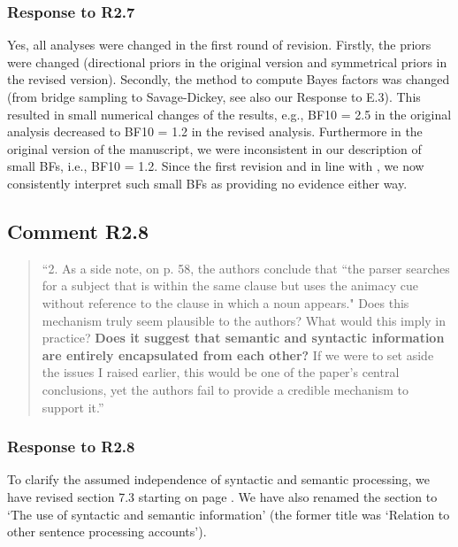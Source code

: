 \documentclass[12pt]{article}
\begin{document}
\subsubsection*{Response to R2.7}
Yes, all analyses were changed in the first round of revision. Firstly, the priors were changed (directional priors in the original version and symmetrical priors in the revised version). Secondly, the method to compute Bayes factors was changed (from bridge sampling to Savage-Dickey, see also our Response to E.3). This resulted in small numerical changes of the results, e.g., BF10 = 2.5 in the original analysis decreased to BF10 = 1.2 in the revised analysis. Furthermore in the original version of the manuscript, we were inconsistent in our description of small BFs, i.e., BF10 = 1.2. Since the first revision and in line with \cite{lee2014bayesian}, we now consistently interpret such small BFs as providing no evidence either way.

 
\subsection*{Comment R2.8}
\begin{quote}
``2. As a side note, on p. 58, the authors conclude that ``the parser searches for a subject that is within the same clause but uses the animacy cue without reference to the clause in which a noun appears." Does this mechanism truly seem plausible to the authors? What would this imply in practice? \textbf{Does it suggest that semantic and syntactic information are entirely encapsulated from each other?} If we were to set aside the issues I raised earlier, this would be one of the paper's central conclusions, yet the authors fail to provide a credible mechanism to support it.''
\end{quote}
\subsubsection*{Response to R2.8}

To clarify the assumed independence of syntactic and semantic processing, we have revised section 7.3 starting on page \pageref{synsem}. We have also renamed the section to `The use of syntactic and semantic information' (the former title was `Relation to other sentence processing accounts').

\begin{quote}
\end{quote}

 
\end{document}
